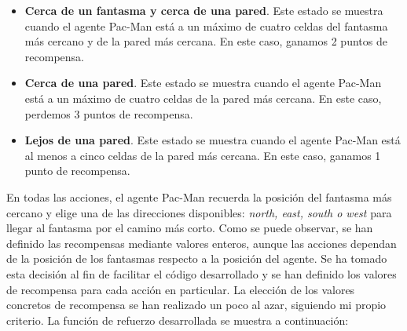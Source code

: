 \documentclass[11pt]{exam}
\begin{document}
\begin{itemize}
	\item \textbf{Cerca de un fantasma y cerca de una pared}. Este estado se muestra cuando el agente Pac-Man está a un máximo de cuatro celdas del fantasma más cercano y de la pared más cercana. En este caso, ganamos 2 puntos de recompensa.
	
	\item \textbf{Cerca de una pared}. Este estado se muestra cuando el agente Pac-Man está a un máximo de cuatro celdas de la pared más cercana. En este caso, perdemos 3 puntos de recompensa.
	
	\item \textbf{Lejos de una pared}. Este estado se muestra cuando el agente Pac-Man está al menos a cinco celdas de la pared más cercana. En este caso, ganamos 1 punto de recompensa.
\end{itemize}

En todas las acciones, el agente Pac-Man recuerda la posición del fantasma más cercano y elige una de las direcciones disponibles: \textit{north, east, south o west} para llegar al fantasma por el camino más corto. Como se puede observar, se han definido las recompensas mediante valores enteros, aunque las acciones dependan de la posición de los fantasmas respecto a la posición del agente. Se ha tomado esta decisión al fin de facilitar el código desarrollado y se han definido los valores de recompensa para cada acción en particular. La elección de los valores concretos de recompensa se han realizado un poco al azar, siguiendo mi propio criterio. La función de refuerzo desarrollada se muestra a continuación:
\vspace*{3mm}
\end{document}
